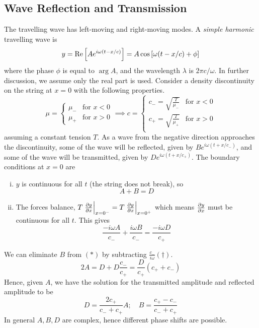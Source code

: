 \subsection{Wave Reflection and Transmission}
The travelling wave has left-moving and right-moving modes.
A \textit{simple harmonic} travelling wave is
\[ y = \Re\qty[ A e^{i \omega(t-x/c)} ] = A \cos \qty[\omega(t-x/c) + \phi] \]
where the phase \( \phi \) is equal to \( \arg A \), and the wavelength \( \lambda \) is \( 2 \pi c / \omega \).
In further discussion, we assume only the real part is used.
Consider a density discontinuity on the string at \( x = 0 \) with the following properties.
\[ \mu = \begin{cases}
    \mu_- & \text{for } x < 0 \\
    \mu_+ & \text{for } x > 0
\end{cases} \implies c = \begin{cases}
    c_- = \sqrt{\frac{T}{\mu_-}} & \text{for } x < 0 \\
    c_+ = \sqrt{\frac{T}{\mu_+}} & \text{for } x > 0 \\
\end{cases} \]
assuming a constant tension \( T \).
As a wave from the negative direction approaches the discontinuity, some of the wave will be reflected, given by \( B e^{i \omega(t + x/c_-)} \), and some of the wave will be transmitted, given by \( D e^{i \omega(t + x/c_+)} \).
The boundary conditions at \( x = 0 \) are
\begin{enumerate}[(i)]
    \item \( y \) is continuous for all \( t \) (the string does not break), so
    \begin{equation}
        A + B = D \tag{\(\ast\)}
    \end{equation}
    \item The forces balance, \( T \eval{\pdv{y}{x}}_{x = 0^-} = T \eval{\pdv{y}{x}}_{x = 0^+} \) which means \( \pdv{y}{x} \) must be continuous for all \( t \).
    This gives
    \begin{equation}
        \frac{-i\omega A}{c_-} + \frac{i \omega B}{c_-} = \frac{-i \omega D}{c_+} \tag{\(\dagger\)}
    \end{equation}
\end{enumerate}
We can eliminate \( B \) from \( (\ast) \) by subtracting \( \frac{c_-}{i \omega}(\dagger) \).
\[ 2A = D + D \frac{c_-}{c_+} = \frac{D}{c_+}(c_+ + c_-) \]
Hence, given \( A \), we have the solution for the transmitted amplitude and reflected amplitude to be
\[ D = \frac{2 c_+}{c_- + c_+} A;\quad B = \frac{c_+ - c_-}{c_- + c_+} \]
In general \( A, B, D \) are complex, hence different phase shifts are possible.

